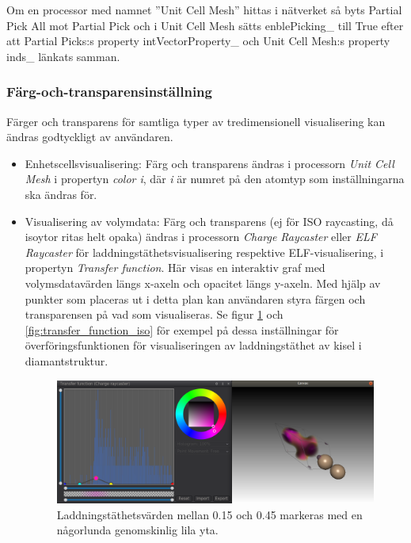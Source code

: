 \documentclass[a4paper,12pt]{article}
\begin{document}
Om en processor med namnet ''Unit Cell Mesh'' hittas i nätverket så byts Partial Pick All mot Partial Pick och i Unit Cell Mesh sätts enblePicking\_ till True efter att Partial Picks:s property intVectorProperty\_ och Unit Cell Mesh:s property inds\_ länkats samman.


\subsubsection{Färg-och-transparensinställning}
Färger och transparens för samtliga typer av tredimensionell visualisering kan ändras godtyckligt av användaren.

\begin{itemize}

\item Enhetscellsvisualisering: Färg och transparens ändras i processorn \textit{Unit Cell Mesh} i propertyn \textit{color i}, där \textit{i} är numret på den atomtyp som inställningarna ska ändras för.

\item Visualisering av volymdata: Färg och transparens (ej för ISO raycasting, då isoytor ritas helt opaka) ändras i processorn \textit{Charge Raycaster} eller \textit{ELF Raycaster} för laddningstäthetsvisualisering respektive ELF-visualisering, i propertyn \textit{Transfer function}. Här visas en interaktiv graf med volymsdatavärden längs x-axeln och opacitet längs y-axeln. Med hjälp av punkter som placeras ut i detta plan kan användaren styra färgen och transparensen på vad som visualiseras. Se figur \ref{fig:transfer_function_transparent} och \ref{fig:transfer_function_iso} för exempel på dessa inställningar för överföringsfunktionen för visualiseringen av laddningstäthet av kisel i diamantstruktur.

\begin{figure} [H]
\centering
\includegraphics[scale=0.4]{screenshot_transfer_function_transparent.png}
\caption{Laddningstäthetsvärden mellan 0.15 och 0.45 markeras med en någorlunda genomskinlig lila yta.}
\label{fig:transfer_function_transparent}
\end{figure}


\end{itemize}
\end{document}
